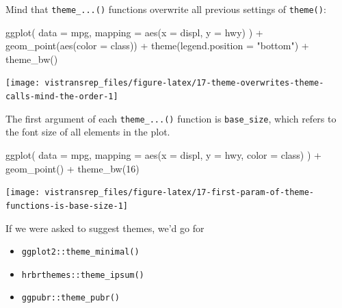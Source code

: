 \documentclass[]{book}
\newenvironment{Shaded}{}{}
\newcommand{\DataTypeTok}[1]{#1}
\newcommand{\DecValTok}[1]{#1}
\newcommand{\KeywordTok}[1]{\textcolor[rgb]{0.00,0.00,1.00}{#1}}
\newcommand{\NormalTok}[1]{#1}
\newcommand{\OperatorTok}[1]{#1}
\newcommand{\StringTok}[1]{\textcolor[rgb]{0.00,0.50,0.50}{#1}}
\providecommand{\tightlist}{%
  \setlength{\itemsep}{0pt}\setlength{\parskip}{0pt}}
\begin{document}
Mind that \texttt{theme\_...()} functions overwrite all previous settings of \texttt{theme()}:

\begin{Shaded}
\begin{Highlighting}[]
\KeywordTok{ggplot}\NormalTok{(}
  \DataTypeTok{data =}\NormalTok{ mpg,}
  \DataTypeTok{mapping =} \KeywordTok{aes}\NormalTok{(}\DataTypeTok{x =}\NormalTok{ displ, }\DataTypeTok{y =}\NormalTok{ hwy)}
\NormalTok{) }\OperatorTok{+}
\StringTok{  }\KeywordTok{geom_point}\NormalTok{(}\KeywordTok{aes}\NormalTok{(}\DataTypeTok{color =}\NormalTok{ class)) }\OperatorTok{+}
\StringTok{  }\KeywordTok{theme}\NormalTok{(}\DataTypeTok{legend.position =} \StringTok{"bottom"}\NormalTok{) }\OperatorTok{+}
\StringTok{  }\KeywordTok{theme_bw}\NormalTok{()}
\end{Highlighting}
\end{Shaded}

\begin{flushright}\texttt{[image: vistransrep\_files/figure-latex/17-theme-overwrites-theme-calls-mind-the-order-1]} \end{flushright}

The first argument of each \texttt{theme\_...()} function is \texttt{base\_size}, which refers to the font size of all elements in the plot.

\begin{Shaded}
\begin{Highlighting}[]
\KeywordTok{ggplot}\NormalTok{(}
  \DataTypeTok{data =}\NormalTok{ mpg,}
  \DataTypeTok{mapping =} \KeywordTok{aes}\NormalTok{(}\DataTypeTok{x =}\NormalTok{ displ, }\DataTypeTok{y =}\NormalTok{ hwy, }\DataTypeTok{color =}\NormalTok{ class)}
\NormalTok{) }\OperatorTok{+}
\StringTok{  }\KeywordTok{geom_point}\NormalTok{() }\OperatorTok{+}
\StringTok{  }\KeywordTok{theme_bw}\NormalTok{(}\DecValTok{16}\NormalTok{)}
\end{Highlighting}
\end{Shaded}

\begin{flushright}\texttt{[image: vistransrep\_files/figure-latex/17-first-param-of-theme-functions-is-base-size-1]} \end{flushright}

If we were asked to suggest themes, we'd go for

\begin{itemize}
\tightlist
\item
  \texttt{ggplot2::theme\_minimal()}
\item
  \texttt{hrbrthemes::theme\_ipsum()}
\item
  \texttt{ggpubr::theme\_pubr()}
\end{itemize}
\end{document}
